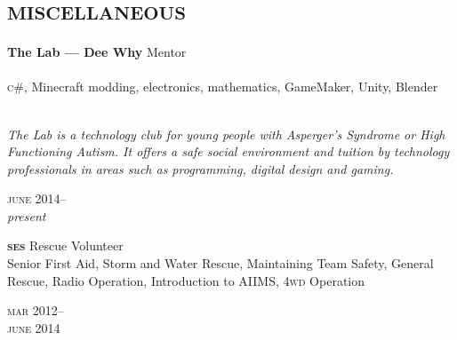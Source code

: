 

\section*{\textsc{miscellaneous}}
\vspace{-0.2cm}

\begin{minipage}[t]{0.75\textwidth}
\textbf{The Lab --- Dee Why}\phantom{..} Mentor \\
\\
\textsc{c\#}, Minecraft modding, electronics, mathematics, GameMaker, 
Unity, Blender
\\
\\
{\small
\textit{The Lab is a technology club for young people with Asperger’s Syndrome or High Functioning Autism. It offers a safe social environment and tuition by technology professionals in areas such as programming, digital design and gaming.}
\par}
\end{minipage}
\begin{minipage}[t]{0.25\textwidth}
{
\hfill \textsc{june} 2014--\\ 
\hspace*{0pt} \hfill \textit{present}
\par
}
\end{minipage}

\vspace{0.2in}

\begin{minipage}[t]{0.75\textwidth}
\textbf{\textsc{ses}}\phantom{..} Rescue Volunteer\\
Senior First Aid, Storm and Water Rescue, Maintaining Team Safety, 
General Rescue, Radio Operation, Introduction to AIIMS, 
\textsc{4wd} Operation
\end{minipage}
\begin{minipage}[t]{0.25\textwidth}
{
\hfill \textsc{mar} 2012--\\ 
\hspace*{0pt} \hfill \textsc{june} 2014
\par
}
\end{minipage}

\vspace{0.2in}

